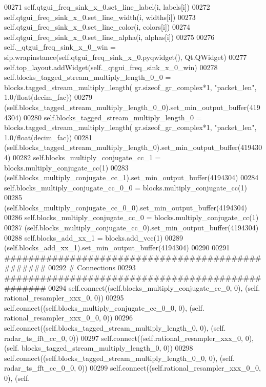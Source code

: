 \begin{DoxyCode}
00271                 self.qtgui\_freq\_sink\_x\_0.set\_line\_label(i, labels[i])
00272             self.qtgui\_freq\_sink\_x\_0.set\_line\_width(i, widths[i])
00273             self.qtgui\_freq\_sink\_x\_0.set\_line\_color(i, colors[i])
00274             self.qtgui\_freq\_sink\_x\_0.set\_line\_alpha(i, alphas[i])
00275         
00276         self._qtgui_freq_sink_x_0_win = sip.wrapinstance(self.qtgui\_freq\_sink\_x\_0.pyqwidget(), Qt.QWidget)
00277         self.top\_layout.addWidget(self._qtgui_freq_sink_x_0_win)
00278         self.blocks_tagged_stream_multiply_length_0_0 = blocks.tagged\_stream\_multiply\_length(
      gr.sizeof\_gr\_complex*1, \textcolor{stringliteral}{"packet\_len"}, 1.0/float(decim\_fac))
00279         (self.blocks_tagged_stream_multiply_length_0_0).set_min_output_buffer(4194304)
00280         self.blocks_tagged_stream_multiply_length_0 = blocks.tagged\_stream\_multiply\_length(
      gr.sizeof\_gr\_complex*1, \textcolor{stringliteral}{"packet\_len"}, 1.0/float(decim\_fac))
00281         (self.blocks_tagged_stream_multiply_length_0).set_min_output_buffer(4194304)
00282         self.blocks_multiply_conjugate_cc_1 = blocks.multiply\_conjugate\_cc(1)
00283         (self.blocks_multiply_conjugate_cc_1).set_min_output_buffer(4194304)
00284         self.blocks_multiply_conjugate_cc_0_0 = blocks.multiply\_conjugate\_cc(1)
00285         (self.blocks_multiply_conjugate_cc_0_0).set_min_output_buffer(4194304)
00286         self.blocks_multiply_conjugate_cc_0 = blocks.multiply\_conjugate\_cc(1)
00287         (self.blocks_multiply_conjugate_cc_0).set_min_output_buffer(4194304)
00288         self.blocks_add_xx_1 = blocks.add\_vcc(1)
00289         (self.blocks_add_xx_1).set_min_output_buffer(4194304)
00290 
00291         \textcolor{comment}{##################################################}
00292         \textcolor{comment}{# Connections}
00293         \textcolor{comment}{##################################################}
00294         self.connect((self.blocks_multiply_conjugate_cc_0, 0), (self.
      rational_resampler_xxx_0, 0))
00295         self.connect((self.blocks_multiply_conjugate_cc_0_0, 0), (self.
      rational_resampler_xxx_0_0, 0))
00296         self.connect((self.blocks_tagged_stream_multiply_length_0, 0), (self.
      radar_ts_fft_cc_0, 0))
00297         self.connect((self.rational_resampler_xxx_0, 0), (self.
      blocks_tagged_stream_multiply_length_0, 0))
00298         self.connect((self.blocks_tagged_stream_multiply_length_0_0, 0), (self.
      radar_ts_fft_cc_0_0, 0))
00299         self.connect((self.rational_resampler_xxx_0_0, 0), (self.

\end{DoxyCode}
